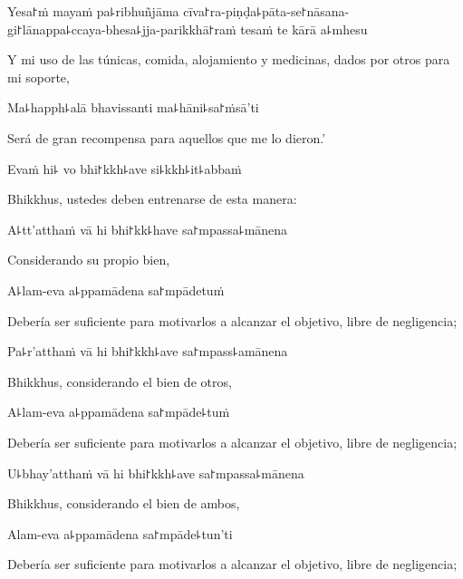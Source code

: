 Yesa꜓ṁ mayaṁ pa꜕ribhuñjāma cīva꜓ra-piṇḍa꜕pāta-se꜓nāsana-\\
gi꜓lānappa꜕ccaya-bhesa꜕jja-parikkhā꜓raṁ tesaṁ te kārā a꜕mhesu

\begin{english}
	Y mi uso de las túnicas, comida, alojamiento y medicinas, dados por otros para mi soporte,
\end{english}

Ma꜕happh꜕alā bhavissanti ma꜕hāni꜕sa꜓ṁsā'ti

\begin{english}
	Será de gran recompensa para aquellos que me lo dieron.'
\end{english}

Evaṁ hi꜕ vo bhi꜓kkh꜕ave si꜕kkh꜕it꜕abbaṁ

\begin{english}
	Bhikkhus, ustedes deben entrenarse de esta manera:
\end{english}

A꜕tt'atthaṁ vā hi bhi꜓kk꜕have sa꜓mpassa꜕mānena

\begin{english}
	Considerando su propio bien,
\end{english}

A꜕lam-eva a꜕ppamādena sa꜓mpādetuṁ

\begin{english}
	Debería ser suficiente para motivarlos a alcanzar el objetivo, libre de negligencia;
\end{english}

Pa꜕r'atthaṁ vā hi bhi꜓kkh꜕ave sa꜓mpass꜕amānena

\begin{english}
	Bhikkhus, considerando el bien de otros,
\end{english}

A꜕lam-eva a꜕ppamādena sa꜓mpāde꜕tuṁ

\begin{english}
	Debería ser suficiente para motivarlos a alcanzar el objetivo, libre de negligencia;
\end{english}

U꜕bhay'atthaṁ vā hi bhi꜓kkh꜕ave sa꜓mpassa꜕mānena

\begin{english}
	Bhikkhus, considerando el bien de ambos,
\end{english}

Alam-eva a꜕ppamādena sa꜓mpāde꜕tun'ti

\begin{english}
	Debería ser suficiente para motivarlos a alcanzar el objetivo, libre de negligencia;
\end{english}

